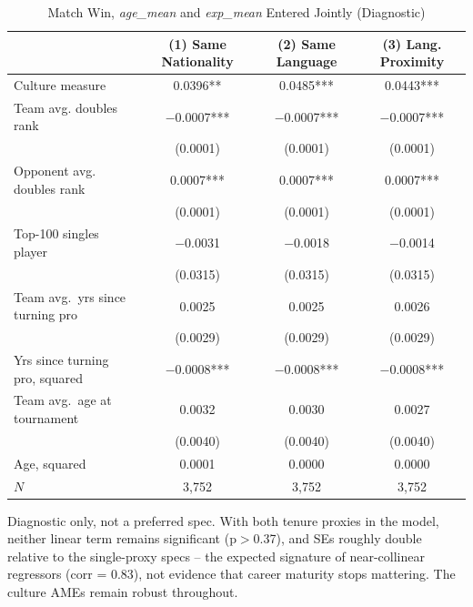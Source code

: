 \documentclass[10pt]{article}
\begin{document}
\begin{table}[htbp]
\color{blue}
\centering
\caption{Match Win, \textit{age\_mean} and \textit{exp\_mean} Entered Jointly (Diagnostic) \label{tab:ta2}}
\begin{threeparttable}
\begin{tabular}{lccc}
\toprule
 & (1) Same Nationality & (2) Same Language & (3) Lang. Proximity \\
\midrule
Culture measure & 0.0396** & 0.0485*** & 0.0443*** \\
Team avg. doubles rank & $-$0.0007*** & $-$0.0007*** & $-$0.0007*** \\
 & (0.0001) & (0.0001) & (0.0001) \\
Opponent avg. doubles rank & 0.0007*** & 0.0007*** & 0.0007*** \\
 & (0.0001) & (0.0001) & (0.0001) \\
Top-100 singles player & $-$0.0031 & $-$0.0018 & $-$0.0014 \\
 & (0.0315) & (0.0315) & (0.0315) \\
Team avg.\ yrs since turning pro & 0.0025 & 0.0025 & 0.0026 \\
 & (0.0029) & (0.0029) & (0.0029) \\
Yrs since turning pro, squared & $-$0.0008*** & $-$0.0008*** & $-$0.0008*** \\
Team avg.\ age at tournament & 0.0032 & 0.0030 & 0.0027 \\
 & (0.0040) & (0.0040) & (0.0040) \\
Age, squared & 0.0001 & 0.0000 & 0.0000 \\
\midrule
$N$ & 3,752 & 3,752 & 3,752 \\
\bottomrule
\end{tabular}
\begin{tablenotes}
\small
\item Diagnostic only, not a preferred spec. With both tenure proxies in the model, neither linear term remains significant (p$>$0.37), and SEs roughly double relative to the single-proxy specs -- the expected signature of near-collinear regressors (corr = 0.83), not evidence that career maturity stops mattering. The culture AMEs remain robust throughout.
\end{tablenotes}
\end{threeparttable}
\end{table}
\FloatBarrier
\end{document}
